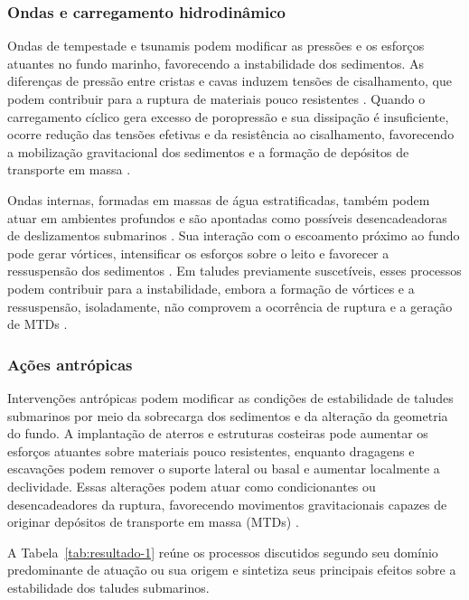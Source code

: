 \subsubsection{Ondas e carregamento hidrodinâmico}\label{sec:2-3-2-7}

Ondas de tempestade e tsunamis podem modificar as pressões e os esforços atuantes no fundo marinho, favorecendo a instabilidade dos sedimentos. As diferenças de pressão entre cristas e cavas induzem tensões de cisalhamento, que podem contribuir para a ruptura de materiais pouco resistentes \cite{scarselli2020}. Quando o carregamento cíclico gera excesso de poropressão e sua dissipação é insuficiente, ocorre redução das tensões efetivas e da resistência ao cisalhamento, favorecendo a mobilização gravitacional dos sedimentos e a formação de depósitos de transporte em massa \cite{scarselli2020}.

Ondas internas, formadas em massas de água estratificadas, também podem atuar em ambientes profundos e são apontadas como possíveis desencadeadoras de deslizamentos submarinos \cite{scarselli2020}. Sua interação com o escoamento próximo ao fundo pode gerar vórtices, intensificar os esforços sobre o leito e favorecer a ressuspensão dos sedimentos \cite{stastna2002}. Em taludes previamente suscetíveis, esses processos podem contribuir para a instabilidade, embora a formação de vórtices e a ressuspensão, isoladamente, não comprovem a ocorrência de ruptura e a geração de MTDs \cite{stastna2002}.

\subsubsection{Ações antrópicas}\label{sec:2-3-2-8}

Intervenções antrópicas podem modificar as condições de estabilidade de taludes submarinos por meio da sobrecarga dos sedimentos e da alteração da geometria do fundo. A implantação de aterros e estruturas costeiras pode aumentar os esforços atuantes sobre materiais pouco resistentes, enquanto dragagens e escavações podem remover o suporte lateral ou basal e aumentar localmente a declividade. Essas alterações podem atuar como condicionantes ou desencadeadores da ruptura, favorecendo movimentos gravitacionais capazes de originar depósitos de transporte em massa (MTDs) \cite{lee2007,dan2007}.

A Tabela~\ref{tab:resultado-1} reúne os processos discutidos segundo seu domínio predominante de atuação ou sua origem e sintetiza seus principais efeitos sobre a estabilidade dos taludes submarinos.

